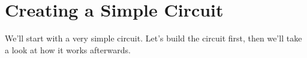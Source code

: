 \section{Creating a Simple Circuit}

We'll start with a very simple circuit. Let's build the circuit first, then we'll take a look at how it works afterwards.